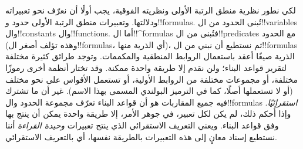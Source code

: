 \documentclass[../../../include/open-logic-section]{subfiles}
\begin{document}


لكي نطور نظرية منطق الرتبة الأولى ونظريته الفوقية، يجب أولًا أن نعرّف
نحو تعبيراته ودلالتها. وتعبيرات منطق الرتبة الأولى حدود و!!{formula}s.
تُبنى الحدود من ال!!{variable}s وال!!{constant}s وال!!{function}s. أما
ال!!^{formula}s فتُبنى من ال!!{predicate}s مع الحدود (وهذه تؤلف أصغر
ال!!{formula}s، أي الذرية منها)، ثم نستطيع أن نبني من
ال!!{formula}s الذرية صيغًا أعقد باستعمال الروابط المنطقية والمكممات.
وتوجد طرائق كثيرة مختلفة لتقرير قواعد البناء؛ ولن نقدم إلا طريقة واحدة
ممكنة. وقد تختار أنظمة أخرى رموزًا مختلفة، أو مجموعات مختلفة من
الروابط الأولية، أو تستعمل الأقواس على نحو مختلف (أو لا تستعملها أصلًا،
كما في الترميز البولندي المسمى بهذا الاسم). غير أن ما تشترك فيه جميع
المقاربات هو أن قواعد البناء تعرّف مجموعة الحدود وال!!{formula}s
\emph{استقرائيًا}. وإذا أُحكم ذلك، لم يكن لكل تعبير، في جوهر الأمر، إلا
طريقة واحدة يمكن أن ينتج بها وفق قواعد البناء. ويعني التعريف الاستقرائي
الذي ينتج تعبيرات \emph{وحيدة القراءة} أننا نستطيع إسناد معانٍ إلى هذه
التعبيرات بالطريقة نفسها، أي بالتعريف الاستقرائي.
\end{document}
